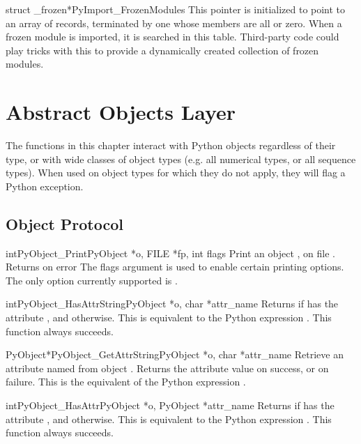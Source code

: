 \documentclass{manual}
\begin{document}
\begin{cvardesc}{struct _frozen*}{PyImport_FrozenModules}
This pointer is initialized to point to an array of  records, terminated by one whose members are all \NULL{}
or zero.  When a frozen module is imported, it is searched in this
table.  Third-party code could play tricks with this to provide a
dynamically created collection of frozen modules.
\end{cvardesc}


\chapter{Abstract Objects Layer \label{abstract}}

The functions in this chapter interact with Python objects regardless
of their type, or with wide classes of object types (e.g. all
numerical types, or all sequence types).  When used on object types
for which they do not apply, they will flag a Python exception.

\section{Object Protocol \label{object}}

\begin{cfuncdesc}{int}{PyObject_Print}{PyObject *o, FILE *fp, int flags}
Print an object , on file .  Returns  on error
The flags argument is used to enable certain printing
options. The only option currently supported is
.
\end{cfuncdesc}

\begin{cfuncdesc}{int}{PyObject_HasAttrString}{PyObject *o, char *attr_name}
Returns  if  has the attribute , and
 otherwise.  This is equivalent to the Python expression
.
This function always succeeds.
\end{cfuncdesc}

\begin{cfuncdesc}{PyObject*}{PyObject_GetAttrString}{PyObject *o, char *attr_name}
Retrieve an attribute named  from object .
Returns the attribute value on success, or \NULL{} on failure.
This is the equivalent of the Python expression
.
\end{cfuncdesc}


\begin{cfuncdesc}{int}{PyObject_HasAttr}{PyObject *o, PyObject *attr_name}
Returns  if  has the attribute , and
 otherwise.  This is equivalent to the Python expression
. 
This function always succeeds.
\end{cfuncdesc}
\end{document}
